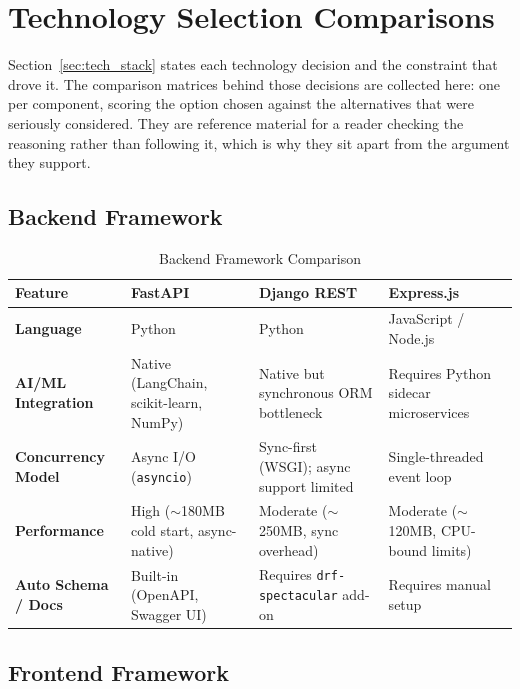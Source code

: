 \section{Technology Selection Comparisons}
\label{appendix:techstack}

Section~\ref{sec:tech_stack} states each technology decision and the constraint that drove it. The comparison matrices behind those decisions are collected here: one per component, scoring the option chosen against the alternatives that were seriously considered. They are reference material for a reader checking the reasoning rather than following it, which is why they sit apart from the argument they support.

\subsection{Backend Framework}

\begin{table}[H]
    \caption{Backend Framework Comparison}
    \centering
    \renewcommand{\arraystretch}{1.3}
    \begin{tabular}{|p{}|p{}|p{}|p{}|}
        \hline
        \textbf{Feature} & \textbf{FastAPI} & \textbf{Django REST} & \textbf{Express.js} \\
        \hline
        \textbf{Language} & Python & Python & JavaScript / Node.js \\
        \textbf{AI/ML Integration} & Native (LangChain, scikit-learn, NumPy) & Native but synchronous ORM bottleneck & Requires Python sidecar microservices \\
        \textbf{Concurrency Model} & Async I/O (\texttt{asyncio}) & Sync-first (WSGI); async support limited & Single-threaded event loop \\
        \textbf{Performance} & High ($\sim$180MB cold start, async-native) & Moderate ($\sim$250MB, sync overhead) & Moderate ($\sim$120MB, CPU-bound limits) \\
        \textbf{Auto Schema / Docs} & Built-in (OpenAPI, Swagger UI) & Requires \texttt{drf-spectacular} add-on & Requires manual setup \\
        \hline
    \end{tabular}
\end{table}

\subsection{Frontend Framework}

